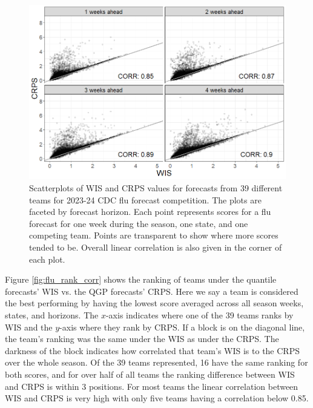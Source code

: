 \documentclass[preprint,12pt,authoryear]{elsarticle}
\begin{document}
\begin{figure}[hbt!]
    \centering
    \includegraphics[scale=.5]{Images/flu_horizon_corr.png}
    \caption{Scatterplots of WIS and CRPS values for forecasts from 39 different teams for 2023-24 CDC flu forecast competition. The plots are faceted by forecast horizon. Each point represents scores for a flu forecast for one week during the season, one state, and one competing team. Points are transparent to show where more scores tended to be. Overall linear correlation is also given in the corner of each plot.}
    \label{fig:flu_horizon_corr}
\end{figure}

Figure \ref{fig:flu_rank_corr} shows the ranking of teams under the quantile forecasts' WIS vs. the QGP forecasts' CRPS. Here we say a team is considered the best performing by having the lowest score averaged across all season weeks, states, and horizons. The $x$-axis indicates where one of the 39 teams ranks by WIS and the $y$-axis where they rank by CRPS. If a block is on the diagonal line, the team's ranking was the same under the WIS as under the CRPS. The darkness of the block indicates how correlated that team's WIS is to the CRPS over the whole season. Of the 39 teams represented, 16 have the same ranking for both scores, and for over half of all teams the ranking difference between WIS and CRPS is within 3 positions. For most teams the linear correlation between WIS and CRPS is very high with only five teams having a correlation below 0.85.
\end{document}
